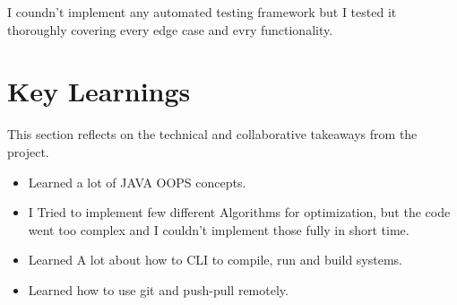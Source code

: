 \documentclass[12pt]{article}
\begin{document}
I coundn't implement any automated testing framework but I tested it thoroughly covering every edge case and evry functionality.

\section{Key Learnings}
\label{sec:learnings}
This section reflects on the technical and collaborative takeaways from the project.

\begin{itemize}[noitemsep]
    \item Learned a lot of JAVA OOPS concepts. 
    \item I Tried to implement few different Algorithms for optimization, but the code went too complex and I couldn't implement those fully in short time.
    \item Learned A lot about how to CLI to compile, run and build systems. 
    \item Learned how to use git and push-pull remotely.
\end{itemize}
\end{document}
